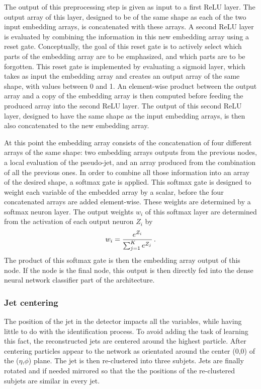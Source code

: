 The output of this preprocessing step is given as input to a first ReLU layer. The output array of this layer, designed to be of the same shape as each of the two input embedding arrays, is concatenated with these arrays. A second ReLU layer is evaluated by combining the information in this new embedding array using a reset gate. Conceptually, the goal of this reset gate is to actively select which parts of the embedding array are to be emphasized, and which parts are to be forgotten. This reset gate is implemented by evaluating a sigmoid layer, which takes as input the embedding array and creates an output array of the same shape, with values between 0 and 1. An element-wise product between the output array and a copy of the embedding array is then computed before feeding the produced array into the second ReLU layer. The output of this second ReLU layer, designed to have the same shape as the input embedding arrays, is then also concatenated to the new embedding array.

At this point the embedding array consists of the concatenation of four different arrays of the same shape: two embedding arrays outputs from the previous nodes, a local evaluation of the pseudo-jet, and an array produced from the combination of all the previous ones. In order to combine all those information into an array of the desired shape, a softmax gate is applied. This softmax gate is designed to weight each variable of the embedded array by a scalar, before the four concatenated arrays are added element-wise. These weights are determined by a softmax neuron layer. The output weights $w_i$ of this softmax layer are determined from the activation of each output neuron $Z_i$ by
\begin{equation}
    w_{i} = \frac{e^{Z_i}}{\sum_{j=1}^{K}e^{Z_j}} \mend
\end{equation}
The product of this softmax gate is then the embedding array output of this node. If the node is the final node, this output is then directly fed into the dense neural network classifier part of the architecture.

\subsubsection{Jet centering}

The position of the jet in the detector impacts all the variables, while having little to do with the identification process. To avoid adding the task of learning this fact, the reconstructed jets are centered around the highest \pt particle. After centering particles appear to the network as orientated around the center (0,0) of the ($\eta$,$\phi$) plane. The jet is then re-clustered into three subjets. Jets are finally rotated and if needed mirrored so that the the positions of the re-clustered subjets are similar in every jet.

